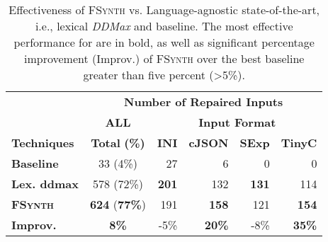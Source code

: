 \documentclass[sigconf,review,anonymous]{acmart}
\newcommand{\approach}{\textsc{FSynth}\xspace}
\newcommand{\ddmax}{\textit{DDMax}\xspace}
\begin{document}
\begin{table}[!tbp]\centering
\caption{Effectiveness of \approach vs. Language-agnostic state-of-the-art, i.e., lexical \ddmax and  baseline.  The most effective performance for are in bold, as well as significant percentage improvement (Improv.) of \approach over the best baseline greater than five percent (>5\%). }
\begin{tabular}{|l | c | r  r  r  r |}
\hline
&  \multicolumn{5}{c|}{\textbf{Number of Repaired Inputs}}  \\
&  \multicolumn{1}{c|}{\textbf{ALL}} & \multicolumn{4}{c|}{\textbf{Input Format}}  \\
\textbf{Techniques} & \textbf{Total} \textbf{(\%)} & \textbf{INI} & \textbf{cJSON} & \textbf{SExp} & \textbf{TinyC} \\
\hline
\textbf{Baseline}   & 33 (4\%) & 27	 & 6 &	0	& 0\\
\textbf{Lex. ddmax} & 578 (72\%) & \textbf{201}  & 132  & \textbf{131} & 114  \\ 		
\hline	
\textbf{\approach}  & \textbf{624} (\textbf{77\%}) & 191 & \textbf{158}  & 121  & \textbf{154} \\
\hline
\textbf{Improv.} &  \textbf{8\%}  & -5\% & \textbf{20\%} & -8\% & \textbf{35\%} \\
\hline
\end{tabular}
\label{tab:effectiveness-no-grammar}
\end{table}
\end{document}
